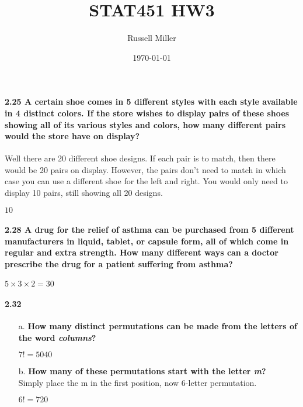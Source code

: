 \documentclass{article}
\title{STAT451 HW3}
\author{Russell Miller}
\date{\today}
\begin{document}
\maketitle

\paragraph{2.25 A certain shoe comes in 5 different styles with each style available 
in 4 distinct colors. If the store wishes to display pairs of these shoes 
showing all of its various styles and colors, how many different pairs would 
the store have on display?\\}
Well there are 20 different shoe designs. If each pair is to match, then there would
be 20 pairs on display. However, the pairs don't need to match in which case you
can use a different shoe for the left and right. You would only need to display
10 pairs, still showing all 20 designs.
\begin{center}
$\boxed{10}$
\end{center}

\paragraph{2.28 A drug for the relief of asthma can be purchased from 5 different 
manufacturers in liquid, tablet, or capsule form, all of which come in regular and 
extra strength. How many different ways can a doctor prescribe the drug for a 
patient suffering from asthma?}
\begin{center}
$\boxed{5 \times 3 \times 2 = 30}$
\end{center}

\paragraph{2.32}
\begin{enumerate}
\item[a.] \textbf{How many distinct permutations can be made from the letters of the word
\emph{columns}?}
\begin{center}
$\boxed{7! = 5040}$
\end{center}
\item[b.] \textbf{How many of these permutations start with the letter \emph{m}?}\\
Simply place the m in the first position, now 6-letter permutation.
\begin{center}
$\boxed{6! = 720}$
\end{center}
\end{enumerate}
\end{document}
